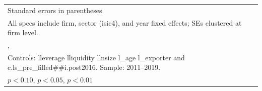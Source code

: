 \begin{table}[htbp]
\begin{tabular}{l*{5}{c}}
\bottomrule
\multicolumn{6}{l}{\footnotesize Standard errors in parentheses}\\
\multicolumn{6}{l}{\footnotesize All specs include firm, sector (isic4), and year fixed effects; SEs clustered at firm level.}\\
\multicolumn{6}{l}{\footnotesize ,}\\
\multicolumn{6}{l}{\footnotesize Controls: lleverage lliquidity llnsize l\_age l\_exporter and c.ls\_pre\_filled##i.post2016. Sample: 2011–2019.}\\
\multicolumn{6}{l}{\footnotesize \sym{*} \(p<0.10\), \sym{**} \(p<0.05\), \sym{***} \(p<0.01\)}\\
\end{tabular}
\end{table}

